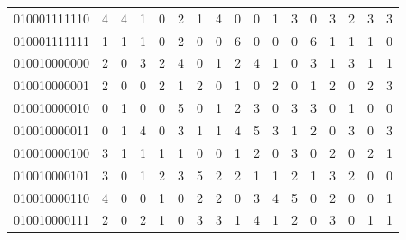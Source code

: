 \documentclass[10pt,a4paper]{article}
\begin{document}
\begin{longtable}{ |c|c|c|c|c|c|c|c|c|c|c|c|c|c|c|c|c| }
    010001111110              & 4                            & 4                                & 1                            & 0                              & 2   & 1   & 4   & 0   & 0   & 1   & 3   & 0   & 3   & 2   & 3   & 3   \\
    010001111111              & 1                            & 1                                & 1                            & 0                              & 2   & 0   & 0   & 6   & 0   & 0   & 0   & 6   & 1   & 1   & 1   & 0   \\
    010010000000              & 2                            & 0                                & 3                            & 2                              & 4   & 0   & 1   & 2   & 4   & 1   & 0   & 3   & 1   & 3   & 1   & 1   \\
    010010000001              & 2                            & 0                                & 0                            & 2                              & 1   & 2   & 0   & 1   & 0   & 2   & 0   & 1   & 2   & 0   & 2   & 3   \\
    010010000010              & 0                            & 1                                & 0                            & 0                              & 5   & 0   & 1   & 2   & 3   & 0   & 3   & 3   & 0   & 1   & 0   & 0   \\
    010010000011              & 0                            & 1                                & 4                            & 0                              & 3   & 1   & 1   & 4   & 5   & 3   & 1   & 2   & 0   & 3   & 0   & 3   \\
    010010000100              & 3                            & 1                                & 1                            & 1                              & 1   & 0   & 0   & 1   & 2   & 0   & 3   & 0   & 2   & 0   & 2   & 1   \\
    010010000101              & 3                            & 0                                & 1                            & 2                              & 3   & 5   & 2   & 2   & 1   & 1   & 2   & 1   & 3   & 2   & 0   & 0   \\
    010010000110              & 4                            & 0                                & 0                            & 1                              & 0   & 2   & 2   & 0   & 3   & 4   & 5   & 0   & 2   & 0   & 0   & 1   \\
    010010000111              & 2                            & 0                                & 2                            & 1                              & 0   & 3   & 3   & 1   & 4   & 1   & 2   & 0   & 3   & 0   & 1   & 1   \\

\end{longtable}
\end{document}
